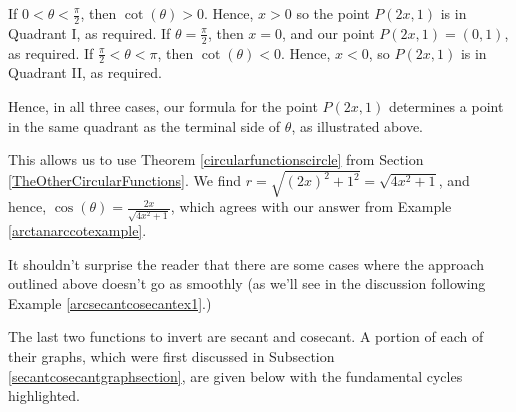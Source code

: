 \smallskip

If $0 < \theta < \frac{\pi}{2}$, then $\cot(\theta) > 0$.  Hence, $x>0$ so the point $P(2x,1)$ is in Quadrant I, as required.  If $\theta = \frac{\pi}{2}$, then $x = 0$, and our point $P(2x,1) = (0,1)$, as required.  If $\frac{\pi}{2} < \theta < \pi$, then $\cot(\theta)<0$.  Hence, $x<0$, so $P(2x,1)$ is in Quadrant II, as required. 

\smallskip

Hence, in all three cases, our formula for the point $P(2x,1)$ determines a point in the same quadrant as the terminal side of $\theta$, as illustrated above.  

\smallskip

This allows us to use Theorem \ref{circularfunctionscircle} from Section \ref{TheOtherCircularFunctions}.  We find $r = \sqrt{(2x)^2+1^2} = \sqrt{4x^2+1}$, and hence,  $\cos(\theta) = \frac{2x}{\sqrt{4x^2+1}}$, which agrees with our answer from Example  \ref{arctanarccotexample}.

\smallskip

It shouldn't surprise the reader that there are some cases where the approach outlined above doesn't go as smoothly (as we'll see in the discussion following Example \ref{arcsecantcosecantex1}.)


\smallskip


The last two functions to invert are secant and cosecant.  A portion of each of their graphs, which were first discussed in Subsection \ref{secantcosecantgraphsection}, are given below with the fundamental cycles highlighted. 

\bigskip

